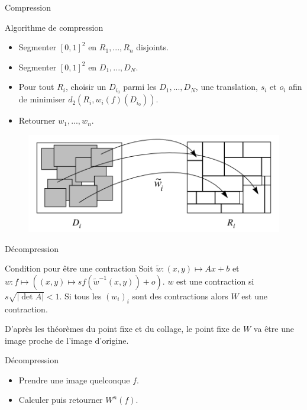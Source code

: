 \documentclass{beamer}
\begin{document}
\begin{frame}{Compression}
\begin{block}{Algorithme de compression}
\begin{itemize}
\item Segmenter $[0, 1]^2$ en $R_1, ..., R_n$ disjoints.
\item Segmenter $[0, 1]^2$ en $D_1, ..., D_N$.
\item Pour tout $R_i$, choisir un $D_{i_0}$ parmi les $D_1, ..., D_N$, une translation, $s_i$ et $o_i$ afin de minimiser $d_2(R_i, w_i(f)(D_{i_0}))$.
\item Retourner $w_1, ..., w_n$.
\end{itemize}
\end{block} 
\begin{center}
\begin{figure}
\includegraphics[scale=0.3]{images/pifs.png}
\end{figure}
\end{center}
\end{frame}

\begin{frame}{Décompression}
\begin{block}{Condition pour être une contraction}
Soit $\tilde{w} : (x, y) \mapsto Ax + b$ et $w : f \mapsto ((x, y) \mapsto s f(\tilde{w}^{-1}(x, y)) + o)$. $w$ est une contraction si $s \sqrt{|\det{A}|} < 1$.
Si tous les $(w_i)_i$ sont des contractions alors $W$ est une contraction. 
\end{block}

D'après les théorèmes du point fixe et du collage, le point fixe de $W$ va être une image proche de l'image d'origine.

\begin{block}{Décompression}
\begin{itemize}
\item Prendre une image quelconque $f$.
\item Calculer puis retourner $W^n(f)$.
\end{itemize}
\end{block}
\end{frame}
\end{document}
